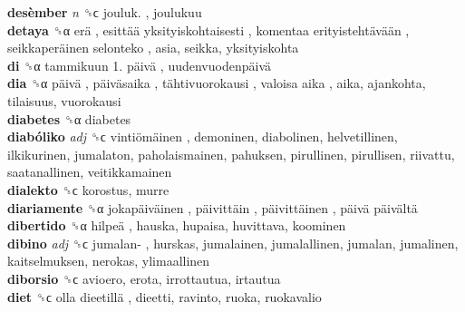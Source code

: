 \textbf{desèmber} \emph{n}  ␝ϲ   jouluk. , joulukuu  \\
\textbf{detaya} ␝α   erä ,  esittää yksityiskohtaisesti ,  komentaa erityistehtävään ,  seikkaperäinen selonteko , asia, seikka, yksityiskohta  \\
\textbf{di} ␝α   tammikuun  1. päivä ,  uudenvuodenpäivä   \\
\textbf{dia} ␝α   päivä ,  päiväsaika ,  tähtivuorokausi ,  valoisa aika , aika, ajankohta, tilaisuus, vuorokausi  \\
\textbf{diabetes} ␝α  diabetes  \\
\textbf{diabóliko} \emph{adj}  ␝ϲ   vintiömäinen , demoninen, diabolinen, helvetillinen, ilkikurinen, jumalaton, paholaismainen, pahuksen, pirullinen, pirullisen, riivattu, saatanallinen, veitikkamainen  \\
\textbf{dialekto} ␝ϲ  korostus, murre  \\
\textbf{diariamente} ␝α   jokapäiväinen ,  päivittäin ,  päivittäinen ,  päivä päivältä   \\
\textbf{dibertido} ␝α   hilpeä , hauska, hupaisa, huvittava, koominen  \\
\textbf{dibino} \emph{adj}  ␝ϲ   jumalan- , hurskas, jumalainen, jumalallinen, jumalan, jumalinen, kaitselmuksen, nerokas, ylimaallinen  \\
\textbf{diborsio} ␝ϲ  avioero, erota, irrottautua, irtautua  \\
\textbf{diet} ␝ϲ   olla dieetillä , dieetti, ravinto, ruoka, ruokavalio  \\
